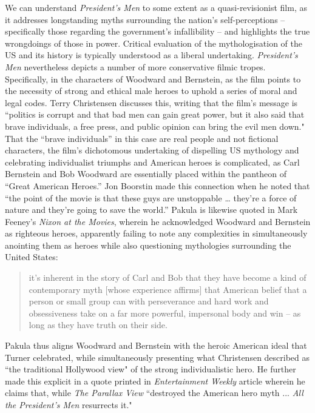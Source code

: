 We can understand \textit{President's Men} to some extent as a quasi-revisionist film, as it addresses longstanding myths surrounding the nation's self-perceptions – specifically those regarding the government's infallibility – and highlights the true wrongdoings of those in power.
Critical evaluation of the mythologisation of the US and its history is typically understood as a liberal undertaking.
\textit{President’s Men} nevertheless depicts a number of more conservative filmic tropes.
Specifically, in the characters of Woodward and Bernstein, as the film points to the necessity of strong and ethical male heroes to uphold a series of moral and legal codes.
Terry Christensen discusses this, writing that the film’s message is ``politics is corrupt and that bad men can gain great power, but it also said that brave individuals, a free press, and public opinion can bring the evil men down."\autocites[][134]{christensen_reel_1987}
That the ``brave individuals” in this case are real people and not fictional characters, the film’s dichotomous undertaking of dispelling US mythology and celebrating individualist triumphs and American heroes is complicated, as Carl Bernstein and Bob Woodward are essentially placed within the pantheon of ``Great American Heroes.”
Jon Boorstin made this connection when he noted that ``the point of the movie is that these guys are unstoppable … they’re a force of nature and they’re going to save the world.”\autocites[Boorstin, quoted in][]{hornaday_how_2022}
Pakula is likewise quoted in Mark Feeney’s \textit{Nixon at the Movies}, wherein he acknowledged Woodward and Bernstein as righteous heroes, apparently failing to note any complexities in simultaneously anointing them as heroes while also questioning mythologies surrounding the United States:
\begin{quote}
it’s inherent in the story of Carl and Bob that they have become a kind of contemporary myth [whose experience affirms] that American belief that a person or small group can with perseverance and hard work and obsessiveness take on a far more powerful, impersonal body and win – as long as they have truth on their side.\autocites[Pakula, quoted in][256]{feeney_nixon_2004}
\end{quote}
Pakula thus aligns Woodward and Bernstein with the heroic American ideal that Turner celebrated, while simultaneously presenting what Christensen described as ``the traditional Hollywood view" of the strong individualistic hero.\autocites[][134]{christensen_reel_1987}
He further made this explicit in a quote printed in \textit{Entertainment Weekly} article wherein he claims that, while \textit{The Parallax View} ``destroyed the American hero myth ... \textit{All the President's Men }resurrects it."\autocites[Pakula, quoted in][]{aquilina_all_2021}

